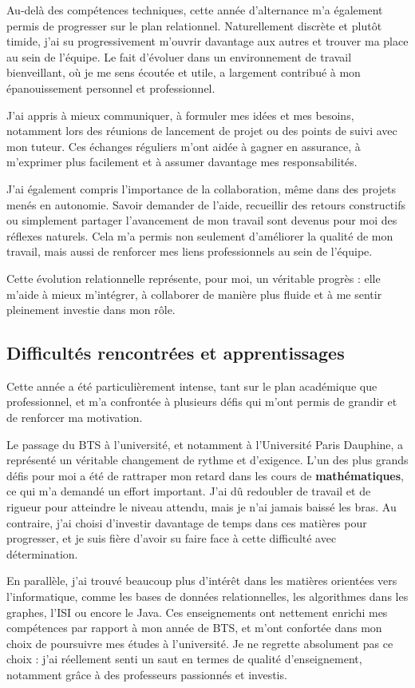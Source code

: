 Au-delà des compétences techniques, cette année d’alternance m’a également permis de progresser sur le plan relationnel. Naturellement discrète et plutôt timide, j’ai su progressivement m’ouvrir davantage aux autres et trouver ma place au sein de l’équipe. Le fait d’évoluer dans un environnement de travail bienveillant, où je me sens écoutée et utile, a largement contribué à mon épanouissement personnel et professionnel.

J’ai appris à mieux communiquer, à formuler mes idées et mes besoins, notamment lors des réunions de lancement de projet ou des points de suivi avec mon tuteur. Ces échanges réguliers m’ont aidée à gagner en assurance, à m’exprimer plus facilement et à assumer davantage mes responsabilités.

J’ai également compris l’importance de la collaboration, même dans des projets menés en autonomie. Savoir demander de l’aide, recueillir des retours constructifs ou simplement partager l’avancement de mon travail sont devenus pour moi des réflexes naturels. Cela m’a permis non seulement d’améliorer la qualité de mon travail, mais aussi de renforcer mes liens professionnels au sein de l’équipe.

Cette évolution relationnelle représente, pour moi, un véritable progrès : elle m’aide à mieux m’intégrer, à collaborer de manière plus fluide et à me sentir pleinement investie dans mon rôle.

\subsection{Difficultés rencontrées et apprentissages}

Cette année a été particulièrement intense, tant sur le plan académique que professionnel, et m’a confrontée à plusieurs défis qui m’ont permis de grandir et de renforcer ma motivation.

Le passage du \textsc{BTS} à l’université, et notamment à l’Université Paris Dauphine, a représenté un véritable changement de rythme et d’exigence. L’un des plus grands défis pour moi a été de rattraper mon retard dans les cours de \textbf{mathématiques}, ce qui m’a demandé un effort important. J’ai dû redoubler de travail et de rigueur pour atteindre le niveau attendu, mais je n’ai jamais baissé les bras. Au contraire, j’ai choisi d’investir davantage de temps dans ces matières pour progresser, et je suis fière d’avoir su faire face à cette difficulté avec détermination.

En parallèle, j’ai trouvé beaucoup plus d’intérêt dans les matières orientées vers l’informatique, comme les bases de données relationnelles, les algorithmes dans les graphes, l’ISI ou encore le Java. Ces enseignements ont nettement enrichi mes compétences par rapport à mon année de BTS, et m’ont confortée dans mon choix de poursuivre mes études à l’université. Je ne regrette absolument pas ce choix : j’ai réellement senti un saut en termes de qualité d’enseignement, notamment grâce à des professeurs passionnés et investis.

